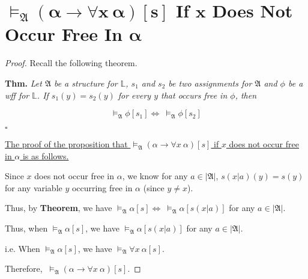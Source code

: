 \documentclass{article}
\newcommand{\whiteqed}{\hfill $\square$\par}
\begin{document}
\section{$\boldsymbol{\vDash_{\mathfrak{A}}\left(\alpha\to\forall x\ \alpha\right)[s]}$ If $\boldsymbol{x}$ Does Not Occur Free In $\boldsymbol{\alpha}$}
\vspace{1em}
\begin{proof}
    Recall the following theorem.

    \hspace{1.3em}
    \textbf{Thm.} \textit{Let $\mathfrak{A}$ be a structure for $\mathbb{L}$, $s_1$ and $s_2$ be two assignments for $\mathfrak{A}$ and $\phi$ be a wff for $\mathbb{L}$. If $s_1(y)=s_2(y)$ for every $y$ that occurs free in $\phi$, then }

    \vspace{-1.5em}
    $$\vDash_\mathfrak{A}\phi[s_1]\Longleftrightarrow\ \vDash_\mathfrak{A}\phi[s_2]$$

    \vspace{-2.6em}
    \whiteqed

    \vspace{1em} \hspace{1.3em}
    \underline{The proof of the proposition that $\vDash_{\mathfrak{A}}\left(\alpha\to\forall x\ \alpha\right)[s]$ if $x$ does not occur free in $\alpha$ is as follows.}

    \hspace{1.3em}
    Since $x$ does not occur free in $\alpha$, we know for any $a\in|\mathfrak{A}|$, $s(x|a)(y)=s(y)$ for any variable $y$ occurring free in $\alpha$ (since $y\neq x$).

    \hspace{1.3em}
    Thus, by \textbf{Theorem}, we have $\vDash_\mathfrak{A}\alpha[s]\Longleftrightarrow\ \vDash_\mathfrak{A}\alpha[s(x|a)]$ for any $a\in|\mathfrak{A}|$.

    \hspace{1.3em}
    Thus, when $\vDash_\mathfrak{A} \alpha [s]$, we have $\vDash_\mathfrak{A}\alpha[s(x|a)]$ for any $a\in|\mathfrak{A}|$.

    \hspace{1.3em}
    i.e. When $\vDash_\mathfrak{A} \alpha [s]$, we have $\vDash_\mathfrak{A} \forall x\ \alpha[s]$.

    \hspace{1.3em}
    Therefore, $\ \vDash_\mathfrak{A}\left(\alpha\to\forall x\ \alpha\right)[s]$.
\end{proof}
\end{document}
